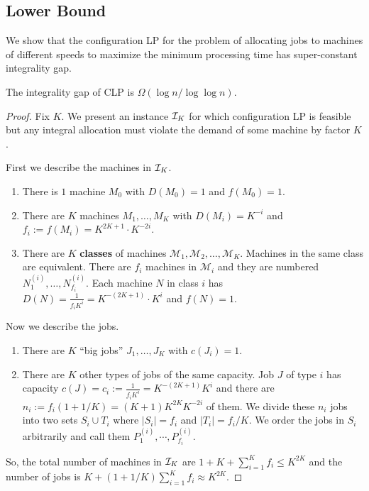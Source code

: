 \subsection{Lower Bound}
We show that the configuration LP for the problem of allocating jobs to machines of different speeds to maximize the minimum processing time has super-constant integrality gap.
\begin{theorem}
	The integrality gap of CLP is $\Omega(\log n/\log\log n)$.
\end{theorem}
\begin{proof}
	\def\M{\mathcal{M}}
	Fix $K$. We present an instance ${\cal I}_K$ for which configuration LP is feasible but any integral allocation must violate the demand of some machine by factor $K$.
	
	First we describe the machines in ${\cal I}_K$.
	\begin{enumerate}
		\item There is $1$ machine $M_0$ with $D(M_0) = 1$ and $f(M_0) = 1$.
		\item There are $K$ machines $M_1,\ldots,M_K$ with $D(M_i) = K^{-i}$ and $f_i := f(M_i) = K^{2K + 1}\cdot K^{-2i}$.
		\item There are $K$ {\bf classes} of machines $\M_1,\M _2,\ldots, \M _K$. Machines in the same class are equivalent. 
		There are $f_i$ machines in $\M_i$ and they are numbered $N^{(i)}_1,\ldots,N^{(i)}_{f_i}$.
		Each machine $N$  in class $i$ has $D(N) = \frac{1}{f_iK^i} = K^{-(2K+ 1)}\cdot K^i$ and $f(N) = 1$.
	\end{enumerate}
	Now we describe the jobs.
	\begin{enumerate}
		\item There are $K$ ``big jobs'' $J_1,\ldots,J_K$ with $c(J_i) = 1$.
		\item There are $K$ other types of jobs of the same capacity. Job $J$ of type $i$ has capacity $c(J) = c_i :=  \frac{1}{f_iK^i} = K^{-(2K+1)}K^i$  and there are $n_i := f_i (1+1/K) = (K+1)K^{2K}K^{-2i}$ of them.
		We divide these $n_i$ jobs into two sets $S_i \cup T_i$ where $|S_i| = f_i$ and $|T_i| = f_i/K$. We order the jobs in $S_i$ arbitrarily and call them $P^{(i)}_1,\cdots,P^{(i)}_{f_i}$.
	\end{enumerate}
	So, the total number of machines in ${\cal I}_K$ are $1 + K + \sum_{i=1}^K f_i  \leq K^{2K}$ and the number of jobs is $K + (1+1/K)\sum_{i=1}^K f_i \approx K^{2K}$. 
	

\end{proof}
